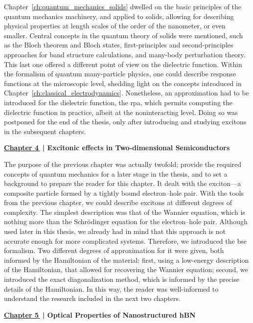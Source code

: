 Chapter~\ref{ch:quantum_mechanics_solids} dwelled on the basic principles of the quantum mechanics machinery, and applied to solids, allowing for describing physical properties at length scales of the order of the nanometer, or even smaller.
Central concepts in the quantum theory of solids were mentioned, such as the Bloch theorem and Bloch states, first-principles and second-principles approaches for band structure calculations, and many-body perturbation theory.
This last one offered a different point of view on the dielectric function.
Within the formalism of quantum many-particle physics, one could describe response functions at the microscopic level, shedding light on the concepts introduced in Chapter~\ref{ch:classical_electrodynamics}.
Nonetheless, an approximation had to be introduced for the dielectric function, the \gls{rpa}, which permits computing the dielectric function in practice, albeit at the noninteracting level.
Doing so was postponed for the end of the thesis, only after introducing and studying excitons in the subsequent chapters.

\noindent
\textbf{\hyperref[ch:Excitons]{Chapter 4\,} \textcolor{black}{|}  Excitonic effects in Two-dimensional Semiconductors}

The purpose of the previous chapter was actually twofold; provide the required concepts of quantum mechanics for a later stage in the thesis, and to set a background to prepare the reader for this chapter.
It dealt with the exciton---a composite particle formed by a tightly bound electron--hole pair.
With the tools from the previous chapter, we could describe excitons at different degrees of complexity.
The simplest description was that of the Wannier equation, which is nothing more than the Schr\"odinger equation for the electron--hole pair.
Although used later in this thesis, we already had in mind that this approach is not accurate enough for more complicated systems.
Therefore, we introduced the \gls{bse} formalism.
Two different degrees of approximation for it were given, both informed by the Hamiltonian of the material: first, using a low-energy description of the Hamiltonian, that allowed for recovering the Wannier equation; second, we introduced the exact diagonalization method, which is informed by the precise details of the Hamiltonian.
In this way, the reader was well-informed to understand the research included in the next two chapters.

\noindent
\textbf{\hyperref[ch:Optical_hBN_superlattice]{Chapter 5\,} \textcolor{black}{|} Optical Properties of Nanostructured hBN}

